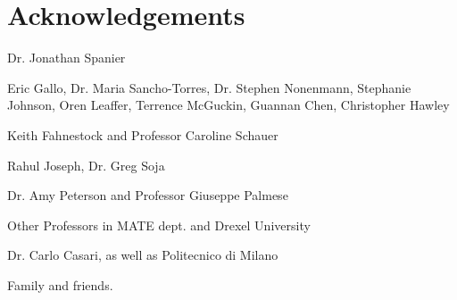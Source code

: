\chapter*{Acknowledgements}


Dr. Jonathan Spanier

Eric Gallo, Dr. Maria Sancho-Torres, Dr. Stephen Nonenmann, Stephanie Johnson, Oren Leaffer, Terrence McGuckin, Guannan Chen, Christopher Hawley

Keith Fahnestock and Professor Caroline Schauer

Rahul Joseph, Dr. Greg Soja

Dr. Amy Peterson and Professor Giuseppe Palmese

Other Professors in MATE dept. and Drexel University

Dr. Carlo Casari, as well as Politecnico di Milano

Family and friends.